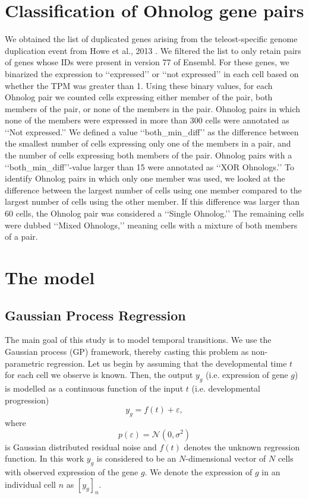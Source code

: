 \section{Classification of Ohnolog gene pairs}

We obtained the list of duplicated genes arising from the teleost-specific genome duplication event from Howe et al., 2013  \cite{Howe2013-ul}. We filtered the list to only retain pairs of genes whose IDs were present in version 77 of Ensembl. For these genes, we binarized the expression to ‘‘expressed’’ or ‘‘not expressed’’ in each cell based on whether the TPM was greater than 1. Using these binary values, for each Ohnolog pair we counted cells expressing either member of the pair, both members of the pair, or none of the members in the pair. Ohnolog pairs in which none of the members were expressed in more than 300 cells were annotated as ‘‘Not expressed.’’ We defined a value ‘‘both\_min\_diff’’ as the difference between the smallest number of cells expressing only one of the members in a pair, and the number of cells expressing both members of the pair. Ohnolog pairs with a ‘‘both\_min\_diff’’-value larger than 15 were annotated as ‘‘XOR Ohnologs.’’ To identify Ohnolog pairs in which only one member was used, we looked at the difference between the largest number of cells using one member compared to the largest number of cells using the other member. If this difference was larger than 60 cells, the Ohnolog pair was considered a ‘‘Single Ohnolog.’’ The remaining cells were dubbed ‘‘Mixed Ohnologs,’’ meaning cells with a mixture of both members of a pair.

\section{The  model} \label{sec:pseudotime-model}

\subsection{Gaussian Process Regression}

The main goal of this study is to model temporal transitions.  We use the Gaussian process (GP) framework, thereby casting this problem as non-parametric regression. Let us begin by assuming that the developmental time $ t $ for each cell we observe is known. Then, the output $ y_g $ (i.e. expression of gene $ g $) is modelled as a continuous function of the input $ t $ (i.e. developmental progression)
\begin{equation}
\label{eq:gpregression}
y_g = f(t) + \varepsilon,
\end{equation}
where
$$ p(\varepsilon) = \mathcal{N}(0, \sigma^2) $$ is Gaussian distributed residual noise and $ f(t) $ denotes the unknown regression function. In this work $ y_g $ is considered to be an $ N $-dimensional vector of $ N $ cells with observed expression of the gene $ g $. We denote the expression of $ g $ in an individual cell $ n $ as $ [y_g]_n $.

